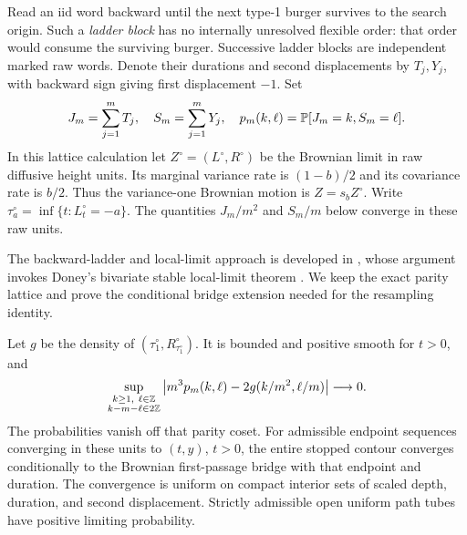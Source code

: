 Read an iid word backward until the next type-1 burger survives to the
search origin.  Such a \emph{ladder block} has no internally unresolved
flexible order: that order would consume the surviving burger.
Successive ladder blocks are independent marked raw words.  Denote
their durations and second displacements by \(T_j,Y_j\), with backward
sign giving first displacement \(-1\).  Set
\[
 J_m=\sum_{j=1}^mT_j,\quad S_m=\sum_{j=1}^mY_j,\quad
 p_m(k,\ell)=\mathbb P[J_m=k,S_m=\ell].
\]
In this lattice calculation let \(Z^\circ=(L^\circ,R^\circ)\)
be the Brownian limit in raw diffusive height units.  Its marginal
variance rate is \((1-b)/2\) and its covariance rate is \(b/2\).
Thus the variance-one Brownian motion is \(Z=s_bZ^\circ\).
Write \(\tau_a^\circ=\inf\{t:L_t^\circ=-a\}\).  The quantities
\(J_m/m^2\) and \(S_m/m\) below converge in these raw units.

The backward-ladder and local-limit approach is developed in
\citet[Section~2.1, Lemma~2.1, Proposition~2.2 and Lemma~2.3]{GwynneSunFKII},
whose argument invokes Doney's bivariate stable local-limit theorem \citep{DoneyBivariate}. We keep the
exact parity lattice and prove the conditional bridge extension needed
for the resampling identity.

\begin{lemma}\label{ker:ladder}
Let \(g\) be the density of \((\tau_1^\circ,R^\circ_{\tau_1^\circ})\).  It is bounded
and positive smooth for \(t>0\), and
\begin{equation}
 \sup_{\substack{k\ge1,\ \ell\in\Z\\k-m-\ell\in2\Z}}
 \left|m^3p_m(k,\ell)-2g(k/m^2,\ell/m)\right|\longrightarrow0.
 \label{ker:llt}
\end{equation}
The probabilities vanish off that parity coset.
For admissible endpoint sequences converging in these units to
\((t,y)\), \(t>0\), the entire stopped contour converges conditionally
to the Brownian first-passage bridge with that endpoint and duration.
The convergence is uniform on compact interior sets of scaled depth,
duration, and second displacement.  Strictly admissible open uniform
path tubes have positive limiting probability.
\end{lemma}


